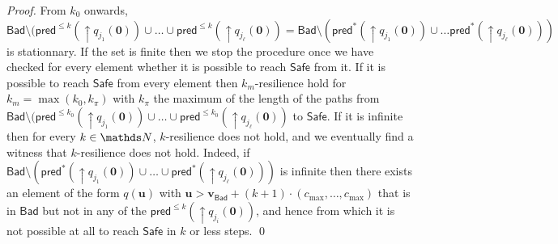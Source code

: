 \documentclass[runningheads]{llncs}
\newcommand{\pred}{\textsf{pred}}
\newcommand{\Bad}{\textsf{Bad}}
\newcommand{\Safe}{\textsf{Safe}}
\begin{document}
\begin{proof}
From $k_0$ onwards,
$\Bad \setminus (\pred^{\leq k}(\mathop{\uparrow} q_{j_1}(\textbf{0}))\cup \ldots \cup \pred^{\leq k}(\mathop{\uparrow} q_{j_\ell}(\textbf{0}))= 
\Bad \setminus (\pred^{*}(\mathop{\uparrow} q_{j_1}(\textbf{0})) \cup \ldots \pred^{*}(\mathop{\uparrow} q_{j_\ell}(\textbf{0})) )$
is stationnary. 
If the set is finite then we stop the procedure once we have checked for every element
whether it is possible to reach $\Safe$ from it.
If it is possible to reach $\Safe$ from every element then {\sc $k_m$-resilience}
hold
for $k_m = \max(k_0, k_{\pi})$ with 
$k_{\pi}$ the maximum of the length of the paths from 
$\Bad \setminus (\pred^{\leq k_0}(\mathop{\uparrow} q_{j_1}(\textbf{0}))\cup \ldots \cup \pred^{\leq k_0}(\mathop{\uparrow} q_{j_\ell}(\textbf{0}))$ to $\Safe$.
If it is infinite then
for every $k \in \N$,
$k$-resilience does not hold, 
and we eventually find a witness that $k$-resilience does not hold.
Indeed, 
if
$\Bad \setminus (\pred^{*}(\mathop{\uparrow} q_{j_1}(\textbf{0})) \cup \ldots \cup \pred^{*}(\mathop{\uparrow} q_{j_\ell}(\textbf{0})) )$
is
infinite
then
there exists an element of the form $q(\textbf{u} )$
with $\textbf{u} > \textbf{v}_{\Bad} + (k+1) \cdot (c_{\max}, \ldots, c_{\max})$ 
that is in $\Bad$ but not in any of the $\pred^{\leq k}(\mathop{\uparrow} q_{j_i}(\textbf{0}))$,
and hence from which it is not possible at all to reach
$\Safe$ in $k$ or less steps.
\qed
\end{proof}
\end{document}
